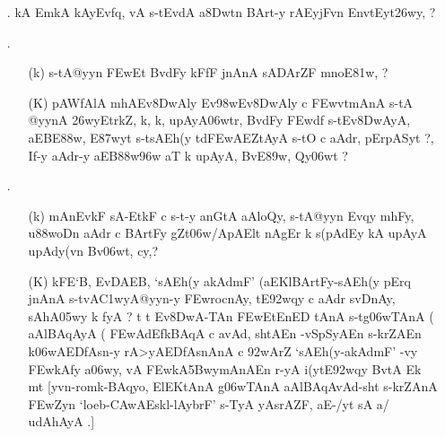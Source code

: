 \begin{itemize}
  \item[{\dn\dnnum \rn{1}}.] {\dn kA EmkA kAy\0Evf\?q, vA s\2-tEvdA a\38Dwtn\? BArt-y rAEyjFvn\? Env\0t\0Eyt\326wy, {\rs ?\re}}  
  
  \item[{\dn\dnnum \rn{2}}.] \begin{itemize} 
                        \item[({\dn k})] {\dn s\2-tA@yyn\2 \3FEwEt BvdFy\? kFfF jnAnA\2 sADArZF mnoE\381w, {\rs ?\re}}
                        
                        \item[({\dn K})] {\dn pAWfAlA mhAEv\38DwAly\? Ev\398wEv\38DwAly\? c \3FEwvt\0mAnA s\2-tA\- @yynA \326wyEtr\?k\?Z{\rs ,\re} k\4, k\4, upAyA\306wtr\4, BvdFy\? \3FEwd\?f\? s\2-tEv\38DwAyA, aEBE\388w, E\387wyt\?{\rs ,\re} s\2-tsAEh(y\? td\3FEwAEZtAyA\2 s\2-tO c aAdr, pErpASyt\? {\rs ?,\re} If-y aAdr-y aEB\388w\?\396w aT\?{\qvb} k\? upAyA, BvE\389w, Qy\306wt\? {\rs ?\re}}
                       \end{itemize}
                       
 \item[{\dn\dnnum \rn{3}}.] \begin{itemize}
                      \item[({\dn k})] {\dn mAnEvkF sA\2-EtkF c s\2-t-y anG\0tA aAloQy{\rs ,\re} s\2-tA@yyn\- Evqy\? mhFy, u\388woDn aAdr\2 c BArtFy gZt\306w/ApAElt\? nAgEr\- k\? s(pAdEy\2 kA upAyA upAd\?y(v\?n Bv\306wt, cy\?,{\rs ?\re}}
                      
                      \item[({\dn K})] {\dn kFE`B, EvDAEB, {\rs `\re}sAEh(y akAd\?mF{\rs '\re} {\rs (\re}aEKl\-BArtFy{\rs -\re}sAEh(y\- pErq jnAnA\2 s\2-tvA\3C1wyA\-@yyn-y \3FEwrocnAy{\rs ,\re} tE\392wqy\? c aAdr\- s\2vD\0nAy{\rs ,\re} sAhA\305wy\2 k\0 fyA {\rs ?\re} t\? t\? Ev\38DwA-TAn\?  \3FEwEtEnED\- tAnA\2 s\2-tg\5\306wTAnA {\rs (\re}\dn\dnnum {} aAlBAqAyA\2 {\rs (\re}\dn\dnnum {} \3FEwAd\?EfkBAqA c avAd\4, shtAEn -vSp\-SyAEn  s\2-krZAEn k\?\306wAEDfAsn-y rA>yAEDfAs\-nAnA\2 c \392wAr\?Z  {\rs `\re}sAEh(y{\rs -\re}akAd\?mF{\rs '\re} -vy\2 \3FEwkAfy\? a\306wy\4, vA \3FEwkA\35BwymAnAEn r-yA\0 i(y\?tE\392wqy\? BvtA\2 Ek\2 mt {\rs [\re}yvn{\rs -\re}romk{\rs -\re}BAqyo, ElEKtAnA\2 g\5\306wTAnA aAlBAqAvAd{\rs -\re}sht s\2-krZAnA\2 \3FEwZ\-yn\?{\rs ,\re} {\rs `\re}loeb{\rs -\re}\3CAwAEskl{\rs -\re}lAyb\5rF{\rs '\re} s\2-TyA yA\break srAZF, aE-/yt\?{\rs ,\re} sA a/ udAhAyA\0 .{\rs ]\re}}
                      

\end{itemize}
\end{itemize}
